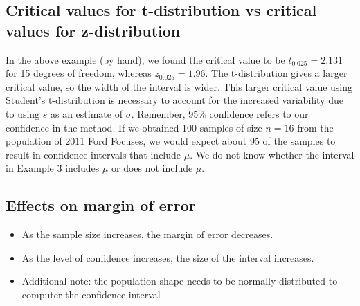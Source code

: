 \documentclass{report}
\begin{document}
    \bigbreak \noindent \bigbreak \noindent 
    \subsection*{Critical values for t-distribution vs critical values for z-distribution}
    \bigbreak \noindent 
      \bigbreak \noindent 
      In the above example (by hand), we found the critical value to be \( t_{0.025} = 2.131 \) for 15 degrees of freedom, whereas \( z_{0.025} = 1.96 \). The t-distribution gives a larger critical value, so the width of the interval is wider. This larger critical value using Student's t-distribution is necessary to account for the increased variability due to using \( s \) as an estimate of \( \sigma \).
        \bigbreak \noindent 
        Remember, 95\% confidence refers to our confidence in the method. If we obtained 100 samples of size \( n = 16 \) from the population of 2011 Ford Focuses, we would expect about 95 of the samples to result in confidence intervals that include \( \mu \). We do not know whether the interval in Example 3 includes \( \mu \) or does not include \( \mu \).

    \bigbreak \noindent \bigbreak \noindent 
    \subsection*{Effects on margin of error}
    \bigbreak \noindent 
    \begin{itemize}
      \item  As the sample size increases, the margin of error decreases.
      \item As the level of confidence increases, the size of the interval increases.
      \item Additional note: the population shape needs to be normally distributed to computer the confidence interval
    \end{itemize}

    \pagebreak 
\end{document}
